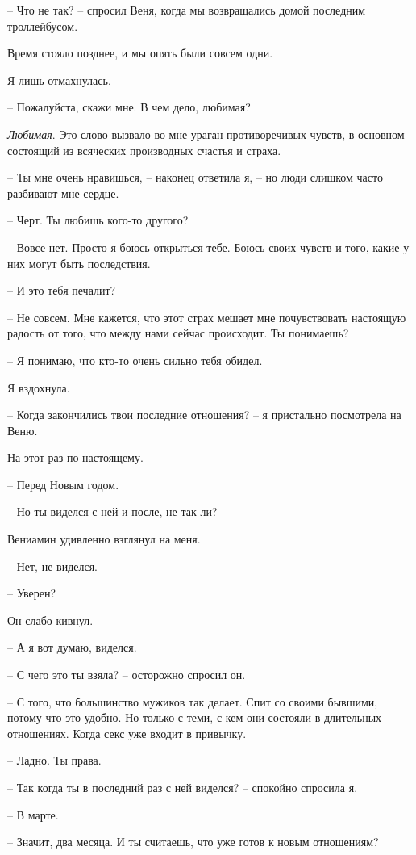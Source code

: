 \documentclass[
]{book}
\begin{document}
-- Что не так? -- спросил Веня, когда мы возвращались домой последним троллейбусом.

Время стояло позднее, и мы опять были совсем одни.

Я лишь отмахнулась.

-- Пожалуйста, скажи мне. В чем дело, любимая?

\emph{Любимая}. Это слово вызвало во мне ураган противоречивых чувств, в основном состоящий из всяческих производных счастья и страха.

-- Ты мне очень нравишься, -- наконец ответила я, -- но люди слишком часто разбивают мне сердце.

-- Черт. Ты любишь кого-то другого?

-- Вовсе нет. Просто я боюсь открыться тебе. Боюсь своих чувств и того, какие у них могут быть последствия.

-- И это тебя печалит?

-- Не совсем. Мне кажется, что этот страх мешает мне почувствовать настоящую радость от того, что между нами сейчас происходит. Ты понимаешь?

-- Я понимаю, что кто-то очень сильно тебя обидел.

Я вздохнула.

-- Когда закончились твои последние отношения? -- я пристально посмотрела на Веню.

На этот раз по-настоящему.

-- Перед Новым годом.

-- Но ты виделся с ней и после, не так ли?

Вениамин удивленно взглянул на меня.

-- Нет, не виделся.

-- Уверен?

Он слабо кивнул.

-- А я вот думаю, виделся.

-- С чего это ты взяла? -- осторожно спросил он.

-- С того, что большинство мужиков так делает. Спит со своими бывшими, потому что это удобно. Но только с теми, с кем они состояли в длительных отношениях. Когда секс уже входит в привычку.

-- Ладно. Ты права.

-- Так когда ты в последний раз с ней виделся? -- спокойно спросила я.

-- В марте.

-- Значит, два месяца. И ты считаешь, что уже готов к новым отношениям?
\end{document}
